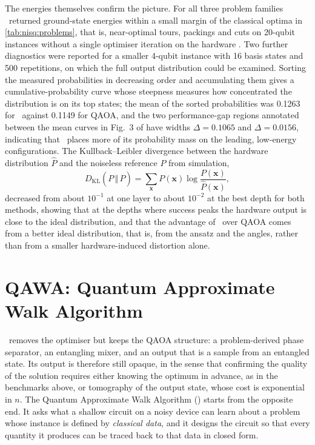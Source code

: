 The energies themselves confirm the picture. For all three problem families \deal\ returned ground-state energies within a small margin of the classical optima in \cref{tab:nisq:problems}, that is, near-optimal tours, packings and cuts on 20-qubit instances without a single optimiser iteration on the hardware \cite{guo2025deal}. Two further diagnostics were reported for a smaller 4-qubit instance with 16 basis states and 500 repetitions, on which the full output distribution could be examined. Sorting the measured probabilities in decreasing order and accumulating them gives a cumulative-probability curve whose steepness measures how concentrated the distribution is on its top states; the mean of the sorted probabilities was 0.1263 for \deal\ against 0.1149 for QAOA, and the two performance-gap regions annotated between the mean curves in Fig.~3 of \cite{guo2025deal} have widths $\Delta=0.1065$ and $\Delta=0.0156$, indicating that \deal\ places more of its probability mass on the leading, low-energy configurations. The Kullback--Leibler divergence between the hardware distribution $\hat{P}$ and the noiseless reference $P$ from simulation,
\begin{equation}\label{eq:nisq:kl}
  D_{\mathrm{KL}}(P\,\Vert\,\hat{P}) = \sum_{\bm{x}} P(\bm{x})\log\frac{P(\bm{x})}{\hat{P}(\bm{x})},
\end{equation}
decreased from about $10^{-1}$ at one layer to about $10^{-2}$ at the best depth for both methods, showing that at the depths where success peaks the hardware output is close to the ideal distribution, and that the advantage of \deal\ over QAOA comes from a better ideal distribution, that is, from the ansatz and the angles, rather than from a smaller hardware-induced distortion alone.

\section{QAWA: Quantum Approximate Walk Algorithm}\label{sec:nisq:qawa}

\deal\ removes the optimiser but keeps the QAOA structure: a problem-derived phase separator, an entangling mixer, and an output that is a sample from an entangled state. Its output is therefore still opaque, in the sense that confirming the quality of the solution requires either knowing the optimum in advance, as in the benchmarks above, or tomography of the output state, whose cost is exponential in $n$. The Quantum Approximate Walk Algorithm (\qawa) \cite{guo2025qawa} starts from the opposite end. It asks what a shallow circuit on a noisy device can learn about a problem whose instance is defined by \emph{classical data}, and it designs the circuit so that every quantity it produces can be traced back to that data in closed form.

